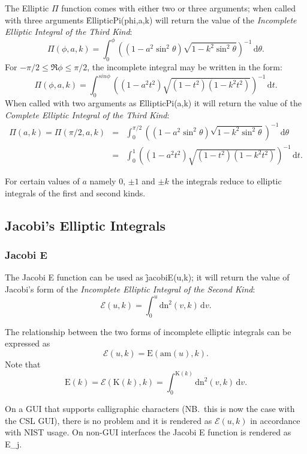The Elliptic $\Pi$ function comes with either two or three arguments;
when called with three arguments \f{EllipticPi(phi,a,k)} will return the
value of the \emph{Incomplete Elliptic Integral of the Third Kind}:
\[\Pi(\phi,a,k)=\int_0^{\phi}
\left((1-a^2\sin^2 \theta)\sqrt{1-k^2 \sin^2 \theta}\right)^{-1}
\,\mathrm{d}\theta.\]
For $-\pi/2 \leq \Re{\phi} \leq \pi/2$, the incomplete integral may be written in
the form:
\[\Pi(\phi,a,k)=\int_0^{sin \phi}
\left((1-a^2t^2)\sqrt{(1-t^2)(1-k^2t^2)}\right)^{-1}\,\mathrm{d}t.\]
When called with two arguments as \f{EllipticPi(a,k)}
it will return the value of the
\emph{Complete Elliptic Integral of the Third Kind}:
\begin{eqnarray*}
  \Pi(a, k)= \Pi(\pi/2,a,k) & = &
\int_0^{\pi/2} \left((1-a^2\sin^2 \theta)\sqrt{1-k^2 \sin^2 \theta}\right)^{-1}
\,\mathrm{d}\theta \\
& =& \int_0^1 \left((1-a^2t^2)\sqrt{(1-t^2)(1-k^2t^2)}\right)^{-1}\,\mathrm{d}t.
\end{eqnarray*}

For certain values of $a$ namely $0$, $\pm 1$ and $\pm k$ the integrals reduce
to elliptic integrals of the first and second kinds.

\subsection{Jacobi's Elliptic Integrals}
\subsubsection{Jacobi E}
\hypertarget{operator:JACOBIE}{}
The Jacobi E function can be used as  \f{jacobiE(u,k)};
it will return the value of Jacobi's form of
the \emph{Incomplete Elliptic Integral of the Second Kind}:
\[\mathcal{E}(u, k)=\int_0^u \mathrm{dn}^2 (v, k) \,\mathrm{d}v.\]

The relationship between the two forms of incomplete elliptic integrals can
be expressed as
\[\mathcal{E}(u, k) = \mathrm{E}(\mathrm{am}(u), k).\]
Note that
\[\mathrm{E}(k)=\mathcal{E}(\mathrm{K}(k), k)
=\int_0^{\mathrm{K}(k)} \mathrm{dn}^2(v, k) \,\mathrm{d}v.\]

On a GUI that supports calligraphic characters (NB.\ this is now the case with the
CSL GUI), there is no problem and it is rendered as $\mathcal{E}(u,k)$
in accordance with NIST usage.
On non-GUI interfaces the Jacobi E function is rendered as E\_j.


